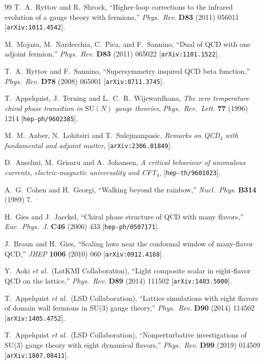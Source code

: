 \documentclass[11pt,a4paper]{article}
\theoremstyle{plain}
\theoremstyle{definition}
\theoremstyle{remark}
\newcommand{\SU}[1]{\mathrm{SU}(#1)}
\begin{document}
\begin{thebibliography}{99}
  T.~A.~Ryttov and R.~Shrock,
  ``Higher-loop corrections to the infrared evolution of a gauge
  theory with fermions,''
  \textit{Phys.~Rev.} \textbf{D83} (2011) 056011
  [\texttt{arXiv:1011.4542}].

  M.~Mojaza, M.~Nardecchia, C.~Pica, and F.~Sannino,
  ``Dual of QCD with one adjoint fermion,''
  \textit{Phys.~Rev.} \textbf{D83} (2011) 065022
  [\texttt{arXiv:1101.1522}].

  T.~A.~Ryttov and F.~Sannino,
  ``Supersymmetry inspired QCD beta function,''
  \textit{Phys.~Rev.} \textbf{D78} (2008) 065001
  [\texttt{arXiv:0711.3745}].

  T.~Appelquist, J.~Terning and L.~C.~R.~Wijewardhana,
  \emph{The zero temperature chiral phase transition in $\SU{N}$ gauge
  theories}, \textit{Phys.~Rev.~Lett.} \textbf{77} (1996) 1214
  [\texttt{hep-ph/9602385}].

  M.~M.~Anber, N.~Lohitsiri and T.~Sulejmanpasic,
  \emph{Remarks on QCD$_4$ with fundamental and adjoint matter},
  [\texttt{arXiv:2306.01849}].

  D.~Anselmi, M.~Grisaru and A.~Johansen,
  \emph{A critical behaviour of anomalous currents, electric-magnetic
  universality and CFT$_4$}, [\texttt{hep-th/9601023}].

  A.~G.~Cohen and H.~Georgi,
  ``Walking beyond the rainbow,''
  \textit{Nucl.~Phys.} \textbf{B314} (1989) 7.

  H.~Gies and J.~Jaeckel,
  ``Chiral phase structure of QCD with many flavors,''
  \textit{Eur.~Phys.~J.} \textbf{C46} (2006) 433
  [\texttt{hep-ph/0507171}].

  J.~Braun and H.~Gies,
  ``Scaling laws near the conformal window of many-flavor QCD,''
  \textit{JHEP} \textbf{1006} (2010) 060
  [\texttt{arXiv:0912.4168}].

  Y.~Aoki \textit{et al.}\ (LatKMI Collaboration),
  ``Light composite scalar in eight-flavor QCD on the lattice,''
  \textit{Phys.~Rev.} \textbf{D89} (2014) 111502
  [\texttt{arXiv:1403.5000}].

  T.~Appelquist \textit{et al.}\ (LSD Collaboration),
  ``Lattice simulations with eight flavors of domain wall fermions
  in SU(3) gauge theory,''
  \textit{Phys.~Rev.} \textbf{D90} (2014) 114502
  [\texttt{arXiv:1405.4752}].

  T.~Appelquist \textit{et al.}\ (LSD Collaboration),
  ``Nonperturbative investigations of SU(3) gauge theory with eight
  dynamical flavors,''
  \textit{Phys.~Rev.} \textbf{D99} (2019) 014509
  [\texttt{arXiv:1807.08411}].


\end{thebibliography}
\end{document}
